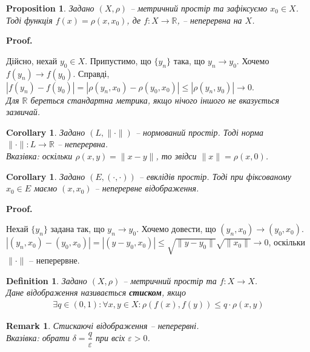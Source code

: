 \documentclass[a4paper, 10pt]{article}
\makeatletter
\theoremstyle{theoremdd}
\theoremstyle{theoremdd}
\newtheorem{definition}[theorem]{Definition}
\theoremstyle{theoremdd}
\theoremstyle{theoremdd}
\theoremstyle{theoremdd}
\newtheorem{proposition}[theorem]{Proposition}
\theoremstyle{theoremdd}
\newtheorem{remark}[theorem]{Remark}
\theoremstyle{theoremdd}
\theoremstyle{theoremdd}
\newtheorem{corollary}[theorem]{Corollary}
\renewenvironment{proof}[1][Proof.\\]{\par
\pushQED{\hfill \qed}%
\normalfont \topsep6\p@\@plus6\p@\relax
\trivlist
\item\relax
{\bfseries
#1\@addpunct{.}}\hspace\labelsep\ignorespaces
}{%
\popQED\endtrivlist\@endpefalse
}
\makeatother
\begin{document}
\begin{proposition}
Задано $(X,\rho)$ -- метричний простір та зафіксуємо $x_0 \in X$. Тоді функція $f(x) = \rho(x,x_0)$, де $f \colon X \to \mathbb{R}$, -- неперервна на $X$.
\end{proposition}

\begin{proof}
Дійсно, нехай $y_0 \in X$. Припустимо, що $\{y_n\}$ така, що  $y_n \to y_0$. Хочемо $f(y_n) \to f(y_0)$. Справді,\\
$|f(y_n) - f(y_0)| = |\rho(y_n,x_0) - \rho(y_0,x_0)| \leq |\rho(y_n,y_0)| \to 0$.\\
\textit{Для $\mathbb{R}$ береться стандартна метрика, якщо нічого іншого не вказується зазвичай.}
\end{proof}

\begin{corollary}
Задано $(L, \|\cdot \|)$ -- нормований простір. Тоді норма $\| \cdot \| \colon L \to \mathbb{R}$ -- неперервна.\\
\textit{Вказівка: оскільки $\rho(x,y) = \|x-y\|$, то звідси $\|x\| = \rho(x,0)$.}
\end{corollary}

\begin{corollary}
Задано $(E, (\cdot,\cdot))$ -- евклідів простір. Тоді при фіксованому $x_0 \in E$ маємо $(x,x_0)$ -- неперервне відображення.
\end{corollary}

\begin{proof}
Нехай $\{y_n\}$ задана так, що $y_n \to y_0$. Хочемо довести, що $(y_n,x_0) \to (y_0,x_0)$.\\
$|(y_n,x_0) - (y_0,x_0)| = |(y-y_0,x_0)| \leq \sqrt{\|y-y_0\|} \sqrt{\|x_0\|} \to 0$, оскільки $\| \cdot \|$ -- неперервне.
\end{proof}

\begin{definition}
Задано $(X,\rho)$ -- метричний простір та $f \colon X \to X$.\\
Дане відображення називається \textbf{стиском}, якщо
\begin{align*}
\exists q \in (0,1): \forall x,y \in X: \rho(f(x),f(y)) \leq q \cdot \rho(x,y)
\end{align*}
\end{definition}

\begin{remark}
Стискаючі відображення -- неперервні.\\
\textit{Вказівка: обрати $\delta = \dfrac{q}{\varepsilon}$ при всіх $\varepsilon > 0$.}
\end{remark}
\end{document}
